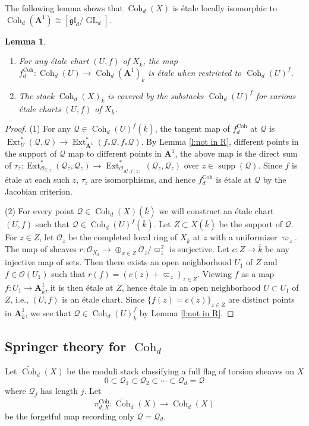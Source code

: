 \documentclass[reqno]{amsart}
\numberwithin{equation}{section}
\newcommand{\wt}[1]{\widetilde{#1}}
\newcommand{\A}{\mathbf{A}}
\DeclareMathOperator{\GL}{GL}
\DeclareMathOperator{\Ext}{Ext}
\DeclareMathOperator{\Coh}{Coh}
\DeclareMathOperator{\supp}{supp}
\newcommand{\ov}{\overline}
\newcommand\op{\oplus}
\newcommand\gl{\mathfrak{gl}}
\renewcommand{\t}{\tau}
\newcommand{\vp}{\varpi}
\newcommand\cO{\mathcal{O}}
\newcommand\cQ{\mathcal{Q}}
\newtheorem{lemma}[thm]{Lemma}
\theoremstyle{remark}
\numberwithin{equation}{section}
\begin{document}
The following lemma shows that $\Coh_{d}(X)$ is \'etale locally isomorphic to $\Coh_{d}(\A^{1})\cong[\gl_{d}/\GL_{d}]$.
\begin{lemma}\label{l:Coh local}
\begin{enumerate}
\item For any \'etale chart $(U,f)$ of $X_{\ov k}$, the map $f^{\Coh}_{d}:\Coh_{d}(U)\to \Coh_{d}(\A^{1})_{\ov k}$  is \'etale when restricted to $\Coh_{d}(U)^{f}$.
\item The stack $\Coh_{d}(X)_{\ov k}$ is covered by the substacks $\Coh_{d}(U)^{f}$ for various \'etale charts $(U,f)$ of $X_{\ov k}$. 
\end{enumerate}
\end{lemma}
\begin{proof}
(1) For any $\cQ\in \Coh_{d}(U)^{f}(\ov k)$, the tangent map of $f_{d}^{\Coh}$  at $\cQ$ is $\Ext^{*}_{U}(\cQ,\cQ)\to \Ext^{*}_{\A^{1}}(f_{*}\cQ, f_{*}\cQ)$. By Lemma \ref{l:not in R}, different points in the support of $\cQ$ map to different points in $\A^{1}$, the above map is the direct sum of $\t_{z}: \Ext^{*}_{\cO_{U,z}}(\cQ_{z},\cQ_{z})\to \Ext^{*}_{\cO_{\A^{1},f(z)}}(\cQ_{z}, \cQ_{z})$ over $z\in \supp(\cQ)$. Since $f$ is \'etale at each such $z$, $\t_{z}$  are isomorphisms, and hence $f_{d}^{\Coh}$ is \'etale at $\cQ$ by the Jacobian criterion. 

(2) For every point $\cQ\in \Coh_{d}(X)(\ov k)$ we will construct an \'etale chart $(U,f)$ such that $\cQ\in \Coh_{d}(U)^{f}(\ov k)$.  Let $Z\subset X(\ov k)$ be the support of $\cQ$.  For $z\in Z$, let $\cO_{z}$ be the completed local ring of $X_{\ov k}$ at $z$ with a uniformizer $\vp_{z}$. The map of sheaves $r: \cO_{X_{\ov k}}\to \op_{x\in Z}\cO_{z}/\vp_{z}^{2}$ is surjective. Let $c:Z\to \ov k$ be any injective map of sets. Then there exists an open neighborhood $U_{1}$ of $Z$ and $f\in \cO(U_{1})$ such that $r(f)=(c(z)+\varpi_{z})_{z\in Z}$. Viewing $f$ as a map $f: U_{1}\to \A^{1}_{\ov k}$, it is then \'etale at $Z$, hence \'etale in an open neighborhood $U\subset U_{1}$ of $Z$, i.e., $(U,f)$ is an \'etale chart. Since  $\{f(z)=c(z)\}_{z\in Z}$ are distinct points in $\A^{1}_{\ov k}$, we see that $\cQ\in \Coh_{d}(U)^{f}_{\ov k}$ by Lemma \ref{l:not in R}.
 \end{proof}

\subsection{Springer theory for $\Coh_{d}$}
Let $\wt\Coh_{d}(X)$ be the moduli stack classifying a full flag of torsion sheaves  on $X$
\begin{equation*}
0\subset \cQ_{1}\subset \cQ_{2}\subset \cdots\subset \cQ_{d}=\cQ
\end{equation*}
where $\cQ_{j}$ has length $j$. Let 
\begin{equation*}
\pi^{\Coh}_{d,X}: \wt\Coh_{d}(X)\to \Coh_{d}(X)
\end{equation*}
be the forgetful map recording only $\cQ=\cQ_{d}$.  
\end{document}
